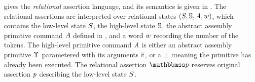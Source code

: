 \Fig{\ref{fig:Syntax of Relational Assertion}} gives 
the {\it relational} assertion language, and its semantics 
is given in \Fig{\ref{fig:Semantics of Relation Assertion}}. 
The relational assertions are interpreted over relational 
states $(S, \mathbb{S}, \textit{A}, w)$, which 
contains the low-level state $S$, 
the high-level state $\mathbb{S}$, 
the abstract assembly primitive command $\textit{A}$ 
defined in \Fig{\ref{fig:Semantics of Relation Assertion}}, 
and a word $w$ recording the number of the tokens. 
The high-level primitive command $\textit{A}$ is 
either an abstract assembly primitive $\Upsilon$ 
parametered with its arguments $\overline{v}$, or a 
$\perp$ meaning the primitive has already been 
executed. The relational assertion $\relastP$ reserves
original assertion $p$ describing the low-level 
state $S$.


